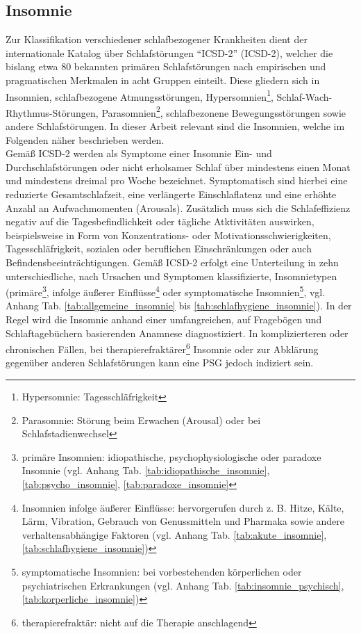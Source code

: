 \subsection{Insomnie}\label{insomnie} 

Zur Klassifikation verschiedener schlafbezogener Krankheiten dient der internationale Katalog über Schlafstörungen "`\acl{ICSD-2}"' (\acs{ICSD-2}), welcher die bislang etwa 80 bekannten primären Schlafstörungen nach empirischen und pragmatischen Merkmalen in acht Gruppen einteilt. Diese gliedern sich in Insomnien, schlafbezogene Atmungsstörungen, Hypersomnien\footnote{Hypersomnie: Tagesschläfrigkeit}, Schlaf-Wach-Rhythmus-Störungen, Parasomnien\footnote{Parasomnie: Störung beim Erwachen (Arousal) oder bei Schlafstadienwechsel}, schlafbezonene Bewegungsstörungen sowie andere Schlafstörungen. In dieser Arbeit relevant sind die Insomnien, welche im Folgenden näher beschrieben werden.\parencite{happe_schlafmedizin_2009, american_academy_of_sleep_medicine_international_2005}\\

Gemäß \acs{ICSD-2} werden als Symptome einer Insomnie Ein- und Durchschlafstörungen oder nicht erholsamer Schlaf über mindestens einen Monat und mindestens dreimal pro Woche bezeichnet. Symptomatisch sind hierbei eine reduzierte Gesamtschlafzeit, eine verlängerte Einschlaflatenz und eine erhöhte Anzahl an Aufwachmomenten (Arousals). Zusätzlich muss sich die Schlafeffizienz negativ auf die Tagesbefindlichkeit oder tägliche Atktivitäten auswirken, beispielsweise in Form von Konzentrations- oder Motivationsschwierigkeiten, Tagesschläfrigkeit, sozialen oder beruflichen Einschränkungen oder auch Befindensbeeinträchtigungen. Gemäß \acs{ICSD-2} erfolgt eine Unterteilung in zehn unterschiedliche, nach Ursachen und Symptomen klassifizierte, Insomnietypen (primäre\footnote{primäre Insomnien: idiopathische, psychophysiologische oder paradoxe Insomnie (vgl. Anhang Tab. \ref{tab:idiopathische_insomnie}, \ref{tab:psycho_insomnie}, \ref{tab:paradoxe_insomnie}}, infolge äußerer Einflüsse\footnote{Insomnien infolge äußerer Einflüsse: hervorgerufen durch z. B. Hitze, Kälte, Lärm, Vibration, Gebrauch von Genussmitteln und Pharmaka sowie andere verhaltensabhängige Faktoren (vgl. Anhang Tab. \ref{tab:akute_insomnie}, \ref{tab:schlafhygiene_insomnie})} oder symptomatische Insomnien\footnote{symptomatische Insomnien: bei vorbestehenden körperlichen oder psychiatrischen Erkrankungen (vgl. Anhang Tab. \ref{tab:insomnie_psychisch}, \ref{tab:korperliche_insomnie})}, vgl. Anhang Tab. \ref{tab:allgemeine_insomnie} bis \ref{tab:schlafhygiene_insomnie}). In der Regel wird die Insomnie anhand einer umfangreichen, auf Fragebögen und Schlaftagebüchern basierenden Anamnese diagnostiziert. In komplizierteren oder chronischen Fällen, bei therapierefraktärer\footnote{therapierefraktär: nicht auf die Therapie anschlagend} Insomnie oder zur Abklärung gegenüber anderen Schlafstörungen kann eine \acs{PSG} jedoch indiziert sein. \parencite{happe_schlafmedizin_2009, american_academy_of_sleep_medicine_international_2005, mayer_s3-leitlinie_2009}\\

